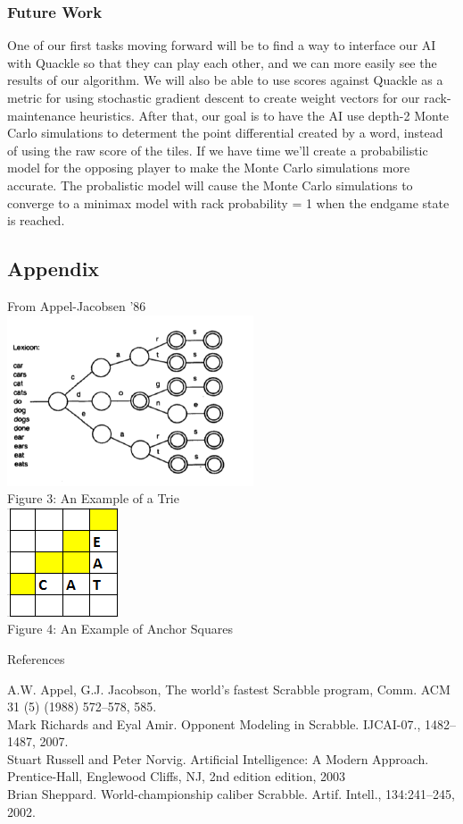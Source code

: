\documentclass[12pt]{article}
\begin{document}
\subsubsection*{Future Work}
One of our first tasks moving forward will be to find a way to interface our AI with Quackle so that they can play each other, and we can more easily see the results of our algorithm. We will also be able to use scores against Quackle as a metric for using stochastic gradient descent to create weight vectors for our rack-maintenance heuristics. After that, our goal is to have the AI use depth-2 Monte Carlo simulations to determent the point differential created by a word, instead of using the raw score of the tiles. If we have time we'll create a probabilistic model for the opposing player to make the Monte Carlo simulations more accurate. The probalistic model will cause the Monte Carlo simulations to converge to a minimax model with rack probability = 1 when the endgame state is reached.
\clearpage
\begin{center}
\section*{Appendix}

  From Appel-Jacobsen '86\\
  \includegraphics[scale=0.6]{../images/trie}\\
Figure 3: An Example of a Trie \\
\includegraphics{../images/anchorexample}\\
Figure 4: An Example of Anchor Squares

\vspace{ 8cm }
{\Large References} 
\end{center}
A.W. Appel, G.J. Jacobson, The world’s fastest Scrabble program, Comm. ACM 31 (5) (1988) 572–578, 585. \\
Mark Richards and Eyal Amir. Opponent Modeling in Scrabble. IJCAI-07., 1482–1487, 2007. \\
Stuart Russell and Peter Norvig. Artificial Intelligence: A Modern Approach. Prentice-Hall,
Englewood Cliffs, NJ, 2nd edition edition, 2003 \\
Brian Sheppard. World-championship caliber Scrabble. Artif. Intell., 134:241–245, 2002. \\
\end{document}
